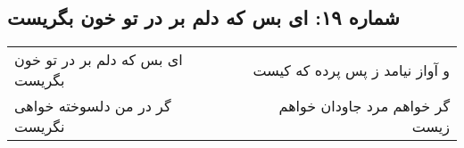 \begin{center}
\section*{شماره ۱۹: ای بس که دلم بر در تو خون بگریست}
\label{sec:019}
\begin{longtable}{l p{0.5cm} r}
ای بس که دلم بر در تو خون بگریست
&&
و آواز نیامد ز پس پرده که کیست
\\
گر در من دلسوخته خواهی نگریست
&&
گر خواهم مرد جاودان خواهم زیست
\\
\end{longtable}
\end{center}
